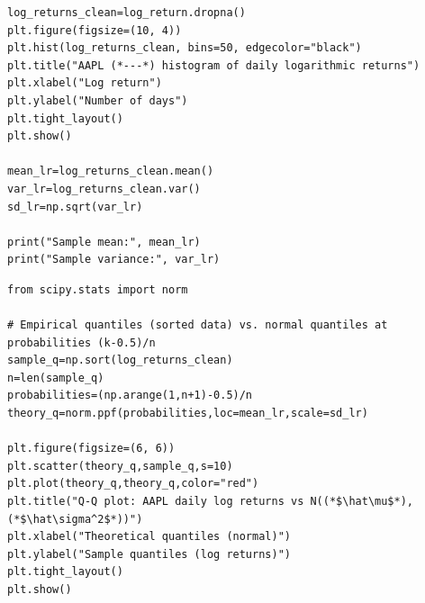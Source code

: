 \documentclass[11pt,a4paper]{article}
\begin{document}
\begin{lstlisting}[caption={Q1b: histogram, sample mean and variance of daily log returns.}, label={lst:q1b-hist}]
log_returns_clean=log_return.dropna()
plt.figure(figsize=(10, 4))
plt.hist(log_returns_clean, bins=50, edgecolor="black")
plt.title("AAPL (*---*) histogram of daily logarithmic returns")
plt.xlabel("Log return")
plt.ylabel("Number of days")
plt.tight_layout()
plt.show()

mean_lr=log_returns_clean.mean()
var_lr=log_returns_clean.var()
sd_lr=np.sqrt(var_lr)

print("Sample mean:", mean_lr)
print("Sample variance:", var_lr)
\end{lstlisting}

\begin{lstlisting}[caption={Q1b: Q-Q plot of daily log returns against $\mathcal N(\hat\mu,\hat\sigma^2)$.}, label={lst:q1b-qq}]
from scipy.stats import norm

# Empirical quantiles (sorted data) vs. normal quantiles at probabilities (k-0.5)/n
sample_q=np.sort(log_returns_clean)
n=len(sample_q)
probabilities=(np.arange(1,n+1)-0.5)/n
theory_q=norm.ppf(probabilities,loc=mean_lr,scale=sd_lr)

plt.figure(figsize=(6, 6))
plt.scatter(theory_q,sample_q,s=10)
plt.plot(theory_q,theory_q,color="red")
plt.title("Q-Q plot: AAPL daily log returns vs N((*$\hat\mu$*), (*$\hat\sigma^2$*))")
plt.xlabel("Theoretical quantiles (normal)")
plt.ylabel("Sample quantiles (log returns)")
plt.tight_layout()
plt.show()
\end{lstlisting}
\end{document}
